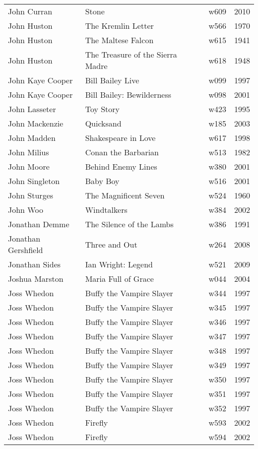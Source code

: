 \documentclass{article}
\begin{document}
\begin {center}
\begin{longtable}{l p{10cm} l l}
John Curran & Stone & w609 & 2010 \\
John Huston & The Kremlin Letter & w566 & 1970 \\
John Huston & The Maltese Falcon & w615 & 1941 \\
John Huston & The Treasure of the Sierra Madre & w618 & 1948 \\
John Kaye Cooper & Bill Bailey Live & w099 & 1997 \\
John Kaye Cooper & Bill Bailey: Bewilderness & w098 & 2001 \\
John Lasseter & Toy Story & w423 & 1995 \\
John Mackenzie & Quicksand & w185 & 2003 \\
John Madden & Shakespeare in Love & w617 & 1998 \\
John Milius & Conan the Barbarian & w513 & 1982 \\
John Moore & Behind Enemy Lines & w380 & 2001 \\
John Singleton & Baby Boy & w516 & 2001 \\
John Sturges & The Magnificent Seven & w524 & 1960 \\
John Woo & Windtalkers & w384 & 2002 \\
Jonathan Demme & The Silence of the Lambs & w386 & 1991 \\
Jonathan Gershfield & Three and Out & w264 & 2008 \\
Jonathan Sides & Ian Wright: Legend & w521 & 2009 \\
Joshua Marston & Maria Full of Grace & w044 & 2004 \\
Joss Whedon & Buffy the Vampire Slayer & w344 & 1997 \\
Joss Whedon & Buffy the Vampire Slayer & w345 & 1997 \\
Joss Whedon & Buffy the Vampire Slayer & w346 & 1997 \\
Joss Whedon & Buffy the Vampire Slayer & w347 & 1997 \\
Joss Whedon & Buffy the Vampire Slayer & w348 & 1997 \\
Joss Whedon & Buffy the Vampire Slayer & w349 & 1997 \\
Joss Whedon & Buffy the Vampire Slayer & w350 & 1997 \\
Joss Whedon & Buffy the Vampire Slayer & w351 & 1997 \\
Joss Whedon & Buffy the Vampire Slayer & w352 & 1997 \\
Joss Whedon & Firefly & w593 & 2002 \\
Joss Whedon & Firefly & w594 & 2002 \\

\end{longtable}
\end{center}
\end{document}
